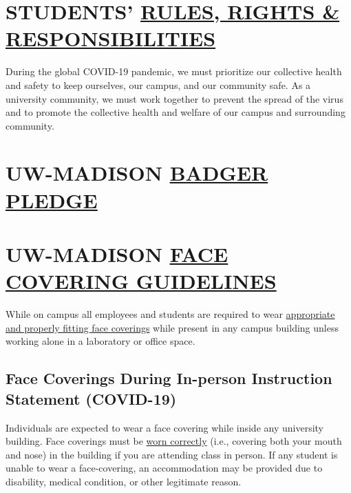 \documentclass[11pt,man]{article}
\begin{document}
\newpage

\hypertarget{students-rules-rights-responsibilities}{%
\section{\texorpdfstring{STUDENTS'
\href{https://guide.wisc.edu/graduate/}{RULES, RIGHTS \&
RESPONSIBILITIES}}{STUDENTS' RULES, RIGHTS \& RESPONSIBILITIES}}\label{students-rules-rights-responsibilities}}

During the global COVID-19 pandemic, we must prioritize our collective
health and safety to keep ourselves, our campus, and our community safe.
As a university community, we must work together to prevent the spread
of the virus and to promote the collective health and welfare of our
campus and surrounding community.

\hypertarget{uw-madison-badger-pledge}{%
\section{\texorpdfstring{UW-MADISON
\href{https://smartrestart.wisc.edu/badgerpledge/}{BADGER
PLEDGE}}{UW-MADISON BADGER PLEDGE}}\label{uw-madison-badger-pledge}}

\hypertarget{uw-madison-face-covering-guidelines}{%
\section{\texorpdfstring{UW-MADISON
\href{https://d1cjb8q1w2lzm7.cloudfront.net/wp-content/uploads/sites/22/2020/06/Cloth-face-cover-guidance-06-22-20-final.pdf}{FACE
COVERING
GUIDELINES}}{UW-MADISON FACE COVERING GUIDELINES}}\label{uw-madison-face-covering-guidelines}}

While on campus all employees and students are required to wear
\href{https://www.cdc.gov/coronavirus/2019-ncov/prevent-getting-sick/how-to-wear-cloth-face-coverings.html}{appropriate
and properly fitting face coverings} while present in any campus
building unless working alone in a laboratory or office space.

\hypertarget{face-coverings-during-in-person-instruction-statement-covid-19}{%
\subsection{Face Coverings During In-person Instruction Statement
(COVID-19)}\label{face-coverings-during-in-person-instruction-statement-covid-19}}

Individuals are expected to wear a face covering while inside any
university building. Face coverings must be
\href{https://www.cdc.gov/coronavirus/2019-ncov/prevent-getting-sick/how-to-wear-cloth-face-coverings.html}{worn
correctly} (i.e., covering both your mouth and nose) in the building if
you are attending class in person. If any student is unable to wear a
face-covering, an accommodation may be provided due to disability,
medical condition, or other legitimate reason.
\end{document}
